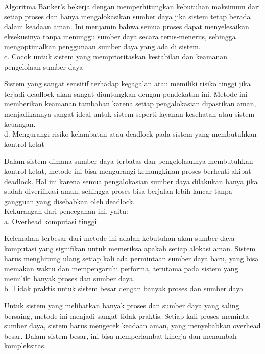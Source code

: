 \documentclass[12pt]{article}
\begin{document}
    Algoritma Banker's bekerja dengan memperhitungkan kebutuhan maksimum dari setiap proses dan hanya mengalokasikan sumber daya jika sistem tetap berada dalam keadaan aman. Ini menjamin bahwa semua proses dapat menyelesaikan eksekusinya tanpa menunggu sumber daya secara terus-menerus, sehingga mengoptimalkan penggunaan sumber daya yang ada di sistem.\\

    c.	Cocok untuk sistem yang memprioritaskan kestabilan dan keamanan pengelolaan sumber daya
    
    Sistem yang sangat sensitif terhadap kegagalan atau memiliki risiko tinggi jika terjadi deadlock akan sangat diuntungkan dengan pendekatan ini. Metode ini memberikan keamanan tambahan karena setiap pengalokasian dipastikan aman, menjadikannya sangat ideal untuk sistem seperti layanan kesehatan atau sistem keuangan.\\

    d.	Mengurangi risiko kelambatan atau deadlock pada sistem yang membutuhkan kontrol ketat
    
    Dalam sistem dimana sumber daya terbatas dan pengelolaannya membutuhkan kontrol ketat, metode ini bisa mengurangi kemungkinan proses berhenti akibat deadlock. Hal ini karena semua pengalokasian sumber daya dilakukan hanya jika sudah diverifikasi aman, sehingga proses bisa berjalan lebih lancar tanpa gangguan yang disebabkan oleh deadlock.\\
    
    Kekurangan dari pencegahan ini, yaitu:\\

	a. Overhead komputasi tinggi

    Kelemahan terbesar dari metode ini adalah kebutuhan akan sumber daya komputasi yang signifikan untuk memeriksa apakah setiap alokasi aman. Sistem harus menghitung ulang setiap kali ada permintaan sumber daya baru, yang bisa memakan waktu dan mempengaruhi performa, terutama pada sistem yang memiliki banyak proses dan sumber daya.\\

	b. Tidak praktis untuk sistem besar dengan banyak proses dan sumber daya

    Untuk sistem yang melibatkan banyak proses dan sumber daya yang saling bersaing, metode ini menjadi sangat tidak praktis. Setiap kali proses meminta sumber daya, sistem harus mengecek keadaan aman, yang menyebabkan overhead besar. Dalam sistem besar, ini bisa memperlambat kinerja dan menambah kompleksitas.\\
\end{document}
